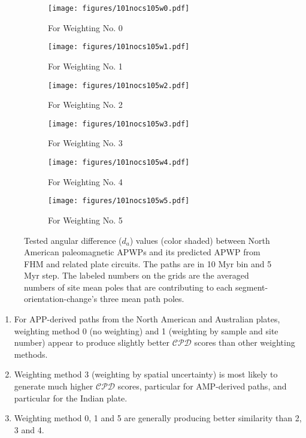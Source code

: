 \begin{figure*}
	\centering
	\begin{subfigure}{.495\textwidth}
		\texttt{[image: figures/101nocs105w0.pdf]}
		\caption{For Weighting No. 0}\label{fig-na-daw0}
	\end{subfigure}
	\vspace{.1em}
	\begin{subfigure}{.495\textwidth}
		\texttt{[image: figures/101nocs105w1.pdf]}
		\caption{For Weighting No. 1}\label{fig-na-daw1}
	\end{subfigure}
	\vspace{.1em}
	\begin{subfigure}{.495\textwidth}
		\texttt{[image: figures/101nocs105w2.pdf]}
		\caption{For Weighting No. 2}\label{fig-na-daw2}
	\end{subfigure}
	\vspace{.1em}
	\begin{subfigure}{.495\textwidth}
		\texttt{[image: figures/101nocs105w3.pdf]}
		\caption{For Weighting No. 3}\label{fig-na-daw3}
	\end{subfigure}
	\vspace{.1em}
	\begin{subfigure}{.495\textwidth}
		\texttt{[image: figures/101nocs105w4.pdf]}
		\caption{For Weighting No. 4}\label{fig-na-daw4}
	\end{subfigure}
	\vspace{.1em}
	\begin{subfigure}{.495\textwidth}
		\texttt{[image: figures/101nocs105w5.pdf]}
		\caption{For Weighting No. 5}\label{fig-na-daw5}
	\end{subfigure}
	\caption[dl of each pair of segment-oreintation-changes for North American
10/5 Myr APWPs]{Tested angular difference ($d_a$) values (color shaded) between
North American paleomagnetic APWPs and its predicted APWP from FHM and related
plate circuits. The paths are in 10 Myr bin and 5 Myr step. The labeled numbers
on the grids are the averaged numbers of site mean poles that are contributing
to each segment-orientation-change's three mean path poles.}\label{fig-nada}
\end{figure*}
%
\begin{enumerate}
  \item For APP-derived paths from the North American and Australian plates,
		weighting method 0 (no weighting) and 1 (weighting by sample and site
		number) appear to produce slightly better $\mathcal{CPD}$ scores than
		other weighting methods.
  \item Weighting method 3 (weighting by spatial uncertainty) is most likely to
		generate much higher $\mathcal{CPD}$ scores, particular for AMP-derived
		paths, and particular for the Indian plate.
  \item Weighting method 0, 1 and 5 are generally producing better similarity
		than 2, 3 and 4.
\end{enumerate}

